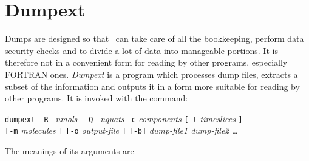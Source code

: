 \section{Dumpext}%
Dumps are designed so that \moldy\ can take care of all the
bookkeeping, perform data security checks and to divide a lot of data
into manageable portions.  It is therefore not in a convenient form
for reading by other programs, especially FORTRAN ones.  {\em
Dumpext\/} is a program which processes dump files, extracts a
subset of the information and outputs it in a form more suitable for
reading by other programs.  It is invoked with the command:
\begin{center}
\verb'dumpext -R ' {\em nmols\/} \verb' -Q ' {\em nquats\/} 
\verb'-c' {\em components\/}
\verb'[-t' {\em timeslices\/} \verb']' \\
\verb'[-m' {\em molecules\/} \verb']'
\verb'[-o' {\em output-file} \verb']'
\verb'[-b]' 
{\em dump-file1 dump-file2} \ldots
\end{center}
The meanings of its arguments are
\newcommand{\boldlabel}[1]{{\bf #1 \hfil}}
